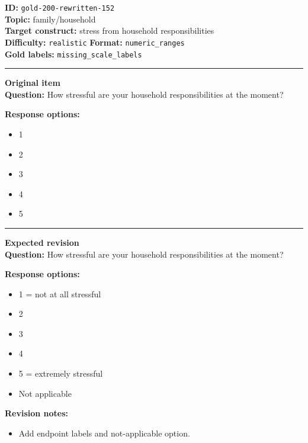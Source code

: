 \documentclass[10pt,a4paper]{article}
\newcommand{\sectionline}{\vspace{0.15em}\hrule\vspace{0.35em}}
\begin{document}
\begin{tcolorbox}[colframe=FlawRed,colback=white,colbacktitle=FlawRed!9,coltitle=black,title={Item 152\hfill Flawed item}]
\textbf{ID:} \texttt{gold-200-rewritten-152}\\
\textbf{Topic:} family/household\\
\textbf{Target construct:} stress from household responsibilities\\
\textbf{Difficulty:} \texttt{realistic} \quad \textbf{Format:} \texttt{numeric\_ranges}\\
\textbf{Gold labels:} \texttt{missing\_scale\_labels}\\
\sectionline
\textbf{Original item}\\
\textbf{Question:} How stressful are your household responsibilities at the moment?
\par\textbf{Response options:}
\begin{itemize}
\item 1
\item 2
\item 3
\item 4
\item 5
\end{itemize}
\sectionline
\textbf{Expected revision}\\
\textbf{Question:} How stressful are your household responsibilities at the moment?
\par\textbf{Response options:}
\begin{itemize}
\item 1 = not at all stressful
\item 2
\item 3
\item 4
\item 5 = extremely stressful
\item Not applicable
\end{itemize}
\par\textbf{Revision notes:}
\begin{itemize}
\item Add endpoint labels and not-applicable option.
\end{itemize}
\end{tcolorbox}
\end{document}
